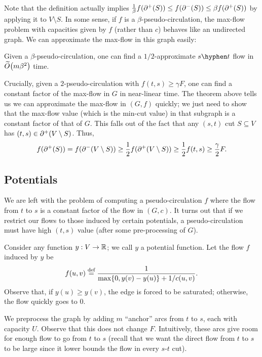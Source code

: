 \documentclass[12 pt]{article}
\begin{document}
Note that the definition actually implies
$\frac{1}{\beta}f(\outcut{S}) \leq f(\incut{S}) \leq \beta f(\outcut{S})$ by
applying it to $V \setminus S$. In some sense, if $f$ is a
$\beta$-pseudo-circulation, the max-flow problem with capacities given by $f$
(rather than $c$) behaves like an undirected graph. We can approximate the
max-flow in this graph easily:

\begin{theorem}
  Given a $\beta$-pseudo-circulation, one can find a $1/2$-approximate
  $s \hyphen t$ flow in $\apxO{m\beta^2}$ time.
\end{theorem}

Crucially, given a $2$-pseudo-circulation with $f(t, s) \geq \gamma F$, one can
find a constant factor of the max-flow in $G$ in near-linear time. The theorem
above tells us we can approximate the max-flow in $(G, f)$ quickly; we just need
to show that the max-flow value (which is the min-cut value) in that subgraph is
a constant factor of that of $G$. This falls out of the fact that any $(s, t)$
cut $S \subseteq V$ has $(t, s) \in \outcut{V \setminus S}$. Thus,
\[
  f(\outcut{S}) =    f(\incut{V \setminus S})
                \geq \frac{1}{2}f(\outcut{V \setminus S})
                \geq \frac{1}{2}f(t, s)
                \geq \frac{\gamma}{2}F.
\]

\subsection{Potentials}

We are left with the problem of computing a pseudo-circulation $f$ where the
flow from $t$ to $s$ is a constant factor of the flow in $(G, c)$. It turns out
that if we restrict our flows to those induced by certain potentials, a
pseudo-circulation must have high $(t, s)$ value (after some pre-processing of
$G$).

Consider any function $y : V \to \mathbb{R}$; we call $y$ a potential function. Let the
flow $f$ induced by $y$ be
\[
  f(u, v) \defeq \frac{1}{\max\Set{0, y(v) - y(u)} + 1/c(u, v)}.
\]
Observe that, if $y(u) \geq y(v)$, the edge is forced to be saturated;
otherwise, the flow quickly goes to $0$.

We preprocess the graph by adding $m$ ``anchor'' arcs from $t$ to $s$, each with
capacity $U$. Observe that this does not change $F$. Intuitively, these arcs
give room for enough flow to go from $t$ to $s$ (recall that we want the direct
flow from $t$ to $s$ to be large since it lower bounds the flow in every $s$-$t$
cut).
\end{document}
